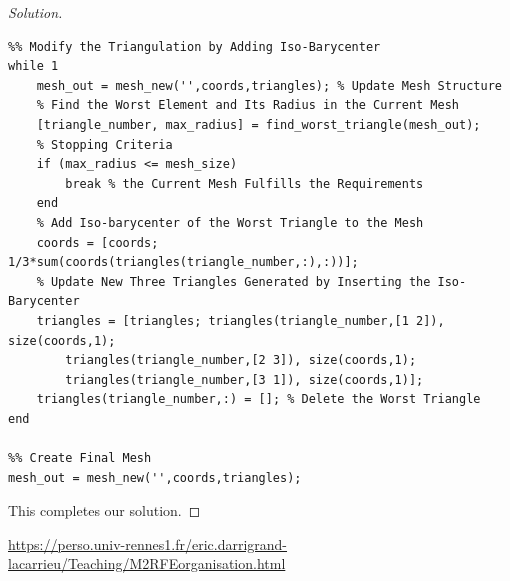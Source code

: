 \documentclass[11pt,a4paper,center,notitlepage]{article}
\numberwithin{equation}{section}
\begin{document}
\begin{proof}[Solution]
\begin{verbatim}
%% Modify the Triangulation by Adding Iso-Barycenter
while 1
    mesh_out = mesh_new('',coords,triangles); % Update Mesh Structure
    % Find the Worst Element and Its Radius in the Current Mesh
    [triangle_number, max_radius] = find_worst_triangle(mesh_out);
    % Stopping Criteria
    if (max_radius <= mesh_size)
        break % the Current Mesh Fulfills the Requirements
    end
    % Add Iso-barycenter of the Worst Triangle to the Mesh
    coords = [coords; 1/3*sum(coords(triangles(triangle_number,:),:))];
    % Update New Three Triangles Generated by Inserting the Iso-Barycenter
    triangles = [triangles; triangles(triangle_number,[1 2]), size(coords,1);
        triangles(triangle_number,[2 3]), size(coords,1);
        triangles(triangle_number,[3 1]), size(coords,1)];
    triangles(triangle_number,:) = []; % Delete the Worst Triangle
end

%% Create Final Mesh
mesh_out = mesh_new('',coords,triangles);
\end{verbatim}
This completes our solution.
\end{proof}




\begin{thebibliography}{999}
 \url{https://perso.univ-rennes1.fr/eric.darrigrand-lacarrieu/Teaching/M2RFEorganisation.html}
\end{thebibliography}
%
%
\end{document}
